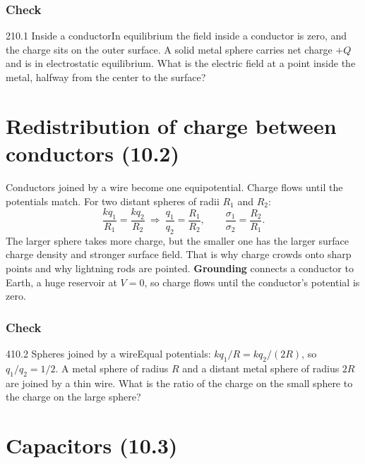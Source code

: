 \documentclass[11pt]{article}
\begin{document}
\subsubsection{Check}\mbox{}

\begin{q}{2}{10.1 Inside a conductor}{In equilibrium the field inside a conductor is zero, and the charge sits on the outer surface.}
A solid metal sphere carries net charge $+Q$ and is in electrostatic equilibrium. What is the electric field at a point inside the metal, halfway from the center to the surface?
\end{q}

\section{Redistribution of charge between conductors (10.2)}\label{sec:2}

Conductors joined by a wire become one equipotential. Charge flows until the potentials match. For two distant spheres of radii $R_1$ and $R_2$:
\[ \frac{kq_1}{R_1} = \frac{kq_2}{R_2} \ \Rightarrow\ \frac{q_1}{q_2} = \frac{R_1}{R_2}, \qquad \frac{\sigma_1}{\sigma_2} = \frac{R_2}{R_1}. \]
The larger sphere takes more charge, but the smaller one has the larger surface charge density and stronger surface field. That is why charge crowds onto sharp points and why lightning rods are pointed. \textbf{Grounding} connects a conductor to Earth, a huge reservoir at $V = 0$, so charge flows until the conductor's potential is zero.

\subsubsection{Check}\mbox{}

\begin{q}{4}{10.2 Spheres joined by a wire}{Equal potentials: $kq_1/R = kq_2/(2R)$, so $q_1/q_2 = 1/2$.}
A metal sphere of radius $R$ and a distant metal sphere of radius $2R$ are joined by a thin wire. What is the ratio of the charge on the small sphere to the charge on the large sphere?
\end{q}

\section{Capacitors (10.3)}\label{sec:3}
\end{document}
